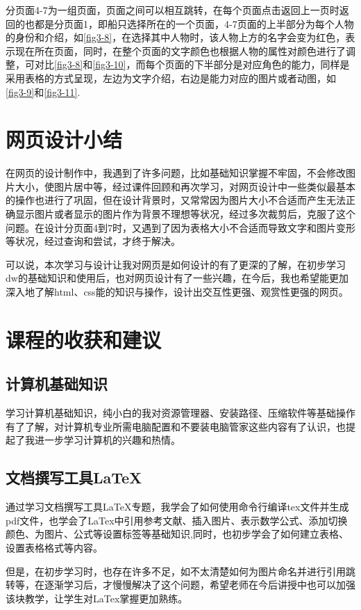 \documentclass[supercite]{Experimental_Report}
\theoremstyle{definition}
\begin{document}
分页面4-7为一组页面，页面之间可以相互跳转，在每个页面点击返回上一页时返回的也都是分页面1，即船只选择所在的一个页面，4-7页面的上半部分为每个人物的身份和介绍，如\textcolor{blue}{\ref{fig3-8}}，在选择其中人物时，该人物上方的名字会变为红色，表示现在所在页面，同时，在整个页面的文字颜色也根据人物的属性对颜色进行了调整，可对比\textcolor{blue}{\ref{fig3-8}}和\textcolor{blue}{\ref{fig3-10}}，而每个页面的下半部分是对应角色的能力，同样是采用表格的方式呈现，左边为文字介绍，右边是能力对应的图片或者动图，如\textcolor{blue}{\ref{fig3-9}}和\textcolor{blue}{\ref{fig3-11}}.


\section{网页设计小结}

在网页的设计制作中，我遇到了许多问题，比如基础知识掌握不牢固，不会修改图片大小，使图片居中等，经过课件回顾和再次学习，对网页设计中一些类似最基本的操作也进行了巩固，但在设计背景时，又常常因为图片大小不合适而产生无法正确显示图片或者显示的图片作为背景不理想等状况，经过多次裁剪后，克服了这个问题。在设计分页面4到7时，又遇到了因为表格大小不合适而导致文字和图片变形等状况，经过查询和尝试，才终于解决。\par
可以说，本次学习与设计让我对网页是如何设计的有了更深的了解，在初步学习dw的基础知识和使用后，也对网页设计有了一些兴趣，在今后，我也希望能更加深入地了解html、css能的知识与操作，设计出交互性更强、观赏性更强的网页。


\newpage

\section{课程的收获和建议}


\subsection{计算机基础知识}

学习计算机基础知识，纯小白的我对资源管理器、安装路径、压缩软件等基础操作有了了解，对计算机专业所需电脑配置和不要装电脑管家这些内容有了认识，也提起了我进一步学习计算机的兴趣和热情。


\subsection{文档撰写工具LaTeX}

通过学习文档撰写工具LaTeX专题，我学会了如何使用命令行编译tex文件并生成pdf文件，也学会了LaTex中引用参考文献、插入图片、表示数学公式、添加切换颜色、为图片、公式等设置标签等基础知识,同时，也初步学会了如何建立表格、设置表格格式等内容。\par 但是，在初步学习时，也存在许多不足，如不太清楚如何为图片命名并进行引用跳转等，在逐渐学习后，才慢慢解决了这个问题，希望老师在今后讲授中也可以加强该块教学，让学生对LaTex掌握更加熟练。
\end{document}
